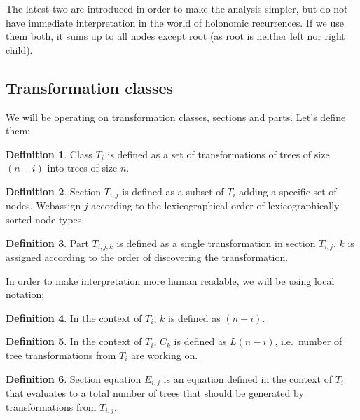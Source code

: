 \documentclass[final]{article}
\theoremstyle{definition}
\newtheorem{definition}{Definition}[subsection]
\theoremstyle{definition}
\theoremstyle{remark}
\begin{document}
The latest two are introduced in order to make the analysis simpler, but do not have immediate interpretation in the world of holonomic recurrences. If we use them both, it sums up to all nodes except root (as root is neither left nor right child).


\subsection{Transformation classes}%
\label{sub:transformation_classes}

We will be operating on transformation classes, sections and parts. Let's define them:

\begin{definition}
    Class \(T_i\) is defined as a set of transformations of trees of size \((n - i)\) into trees of size \(n\).
\end{definition}

\begin{definition}
    Section \(T_{i,j}\) is defined as a subset of \(T_i\) adding a specific set of nodes. Webassign \(j\) according to the lexicographical order of lexicographically sorted node types.
\end{definition}

\begin{definition}
    Part \(T_{i,j,k}\) is defined as a single transformation in section \(T_{i,j}\). \(k\) is assigned according to the order of discovering the transformation.
\end{definition}

In order to make interpretation more human readable, we will be using local notation:

\begin{definition}
    In the context of \(T_i\), \(k\) is defined as \((n - i)\).
\end{definition}

\begin{definition}
    In the context of \(T_i\), \(C_k\) is defined as \(L(n - i)\), i.e.\ number of tree transformations from \(T_i\) are working on.
\end{definition}

\begin{definition}
    Section equation \(E_{i, j}\) is an equation defined in the context of \(T_i\) that evaluates to a total number of trees that should be generated by transformations from \(T_{i, j}\).
\end{definition}
\end{document}
